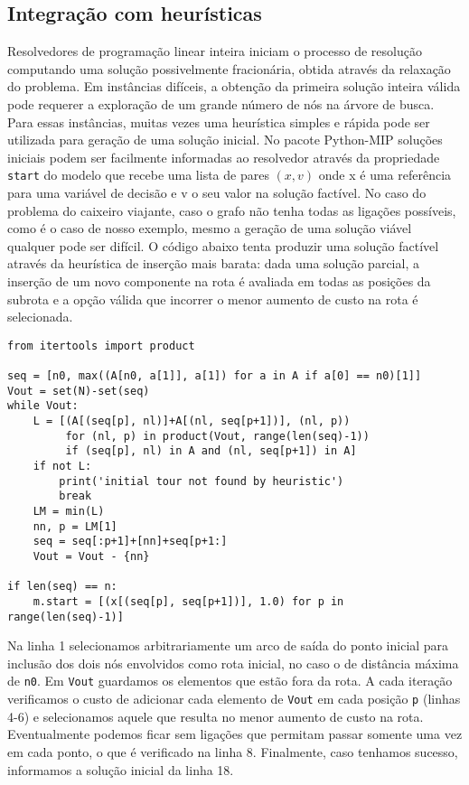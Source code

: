 \documentclass[a4paper,11pt,fleqn]{article}
\begin{document}
\subsection{Integração com heurísticas}

Resolvedores de programação linear inteira iniciam o processo de resolução computando uma solução possivelmente fracionária, obtida através da relaxação do problema. Em instâncias difíceis, a obtenção da primeira solução inteira válida pode requerer a exploração de um grande número de nós na árvore de busca. Para essas instâncias, muitas vezes uma heurística simples e rápida pode ser utilizada para geração de uma solução inicial. No pacote Python-MIP soluções iniciais podem ser facilmente informadas ao resolvedor através da propriedade \texttt{start} do modelo que recebe uma lista de pares $(x,v)$ onde x é uma referência para uma variável de decisão e v o seu valor na solução factível. No caso do problema do caixeiro viajante, caso o grafo não tenha todas as ligações possíveis, como é o caso de nosso exemplo, mesmo a geração de uma solução viável qualquer pode ser difícil. O código abaixo tenta produzir uma solução factível através da heurística de inserção mais barata: dada uma solução parcial, a inserção de um novo componente na rota é avaliada em todas as posições da subrota e a opção válida que incorrer o menor aumento de custo na rota é selecionada.
{\small
\begin{lstlisting}
from itertools import product

seq = [n0, max((A[n0, a[1]], a[1]) for a in A if a[0] == n0)[1]]
Vout = set(N)-set(seq)
while Vout:
    L = [(A[(seq[p], nl)]+A[(nl, seq[p+1])], (nl, p))
         for (nl, p) in product(Vout, range(len(seq)-1))
         if (seq[p], nl) in A and (nl, seq[p+1]) in A]
    if not L:
        print('initial tour not found by heuristic')
        break
    LM = min(L)
    nn, p = LM[1]
    seq = seq[:p+1]+[nn]+seq[p+1:]
    Vout = Vout - {nn}

if len(seq) == n:
    m.start = [(x[(seq[p], seq[p+1])], 1.0) for p in range(len(seq)-1)]
\end{lstlisting}}

Na linha 1 selecionamos arbitrariamente um arco de saída do ponto inicial para inclusão dos dois nós envolvidos como rota inicial, no caso o de distância máxima de \texttt{n0}. Em \texttt{Vout} guardamos os elementos que estão fora da rota. A cada iteração verificamos o custo de adicionar cada elemento de \texttt{Vout} em cada posição \texttt{p} (linhas 4-6) e selecionamos aquele que resulta no menor aumento de custo na rota. Eventualmente podemos ficar sem ligações que permitam passar somente uma vez em cada ponto, o que é verificado na linha 8. Finalmente, caso tenhamos sucesso, informamos a solução inicial da linha 18.

		


\end{document}
